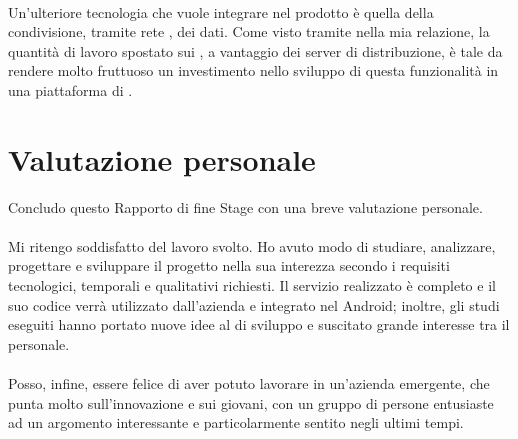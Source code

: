 \paragraph*{}
Un'ulteriore tecnologia che \nomeAzienda{} vuole integrare nel prodotto è quella della condivisione, tramite rete , dei dati. Come visto tramite nella mia relazione, la quantità di lavoro spostato sui , a vantaggio dei server di distribuzione, è tale da rendere molto fruttuoso un investimento nello sviluppo di questa funzionalità in una piattaforma di .

\section{Valutazione personale}
Concludo questo Rapporto di fine Stage con una breve valutazione personale.
\paragraph*{}
Mi ritengo soddisfatto del lavoro svolto. Ho avuto modo di studiare, analizzare, progettare e sviluppare il progetto nella sua interezza secondo i requisiti tecnologici, temporali e qualitativi richiesti. Il servizio realizzato è completo e il suo codice verrà utilizzato dall'azienda e integrato nel  Android; inoltre, gli studi eseguiti hanno portato nuove idee al  di sviluppo e suscitato grande interesse tra il personale.
\paragraph*{}
Posso, infine, essere felice di aver potuto lavorare in un'azienda emergente, che punta molto sull'innovazione e sui giovani, con un gruppo di persone entusiaste ad un argomento interessante e particolarmente sentito negli ultimi tempi.